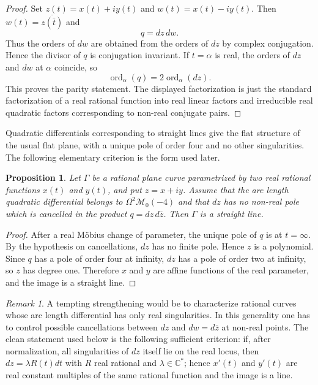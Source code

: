 \documentclass[reqno]{amsart}
\newtheorem{proposition}[theorem]{Proposition}
\theoremstyle{definition}
\theoremstyle{remark}
\newtheorem{rem}[thm]{Remark}
\theoremstyle{definition}
\theoremstyle{definition}
\theoremstyle{definition}
\begin{document}
\begin{proof}
Set $z(t)=x(t)+iy(t)$ and $w(t)=x(t)-iy(t)$. Then $w(t)=\overline{z(\bar t)}$
and
\[
 q=dz\,dw.
\]
Thus the orders of $dw$ are obtained from the orders of $dz$ by complex
conjugation. Hence the divisor of $q$ is conjugation invariant. If
$t=\alpha$ is real, the orders of $dz$ and $dw$ at $\alpha$ coincide, so
\[
 \operatorname{ord}_{\alpha}(q)=2\operatorname{ord}_{\alpha}(dz).
\]
This proves the parity statement. The displayed factorization is just
the standard factorization of a real rational function into real linear
factors and irreducible real quadratic factors corresponding to
non-real conjugate pairs.
\end{proof}

Quadratic differentials corresponding to straight lines give the flat structure of the usual flat plane, with a unique pole of order four and no other singularities. The following elementary criterion is the form used later.

\begin{proposition}\label{prop:line-qminusfour-safe}
Let $\Gamma$ be a rational plane curve parametrized by two real rational functions $x(t)$ and $y(t)$, and put $z=x+iy$. Assume that the arc length quadratic differential belongs to $\Omega^{2}\mathcal{M}_{0}(-4)$ and that $dz$ has no non-real pole which is cancelled in the product $q=dz\,d\overline z$. Then $\Gamma$ is a straight line.
\end{proposition}

\begin{proof}
After a real M\"obius change of parameter, the unique pole of $q$ is at $t=\infty$. By the hypothesis on cancellations, $dz$ has no finite pole. Hence $z$ is a polynomial. Since $q$ has a pole of order four at infinity, $dz$ has a pole of order two at infinity, so $z$ has degree one. Therefore $x$ and $y$ are affine functions of the real parameter, and the image is a straight line.
\end{proof}

\begin{rem}
A tempting strengthening would be to characterize rational curves whose arc length differential has only real singularities. In this generality one has to control possible cancellations between $dz$ and $dw=d\overline z$ at non-real points. The clean statement used below is the following sufficient criterion: if, after normalization, all singularities of $dz$ itself lie on the real locus, then $dz=\lambda R(t)dt$ with $R$ real rational and $\lambda\in\mathbb C^*$; hence $x'(t)$ and $y'(t)$ are real constant multiples of the same rational function and the image is a line.
\end{rem}
\end{document}

